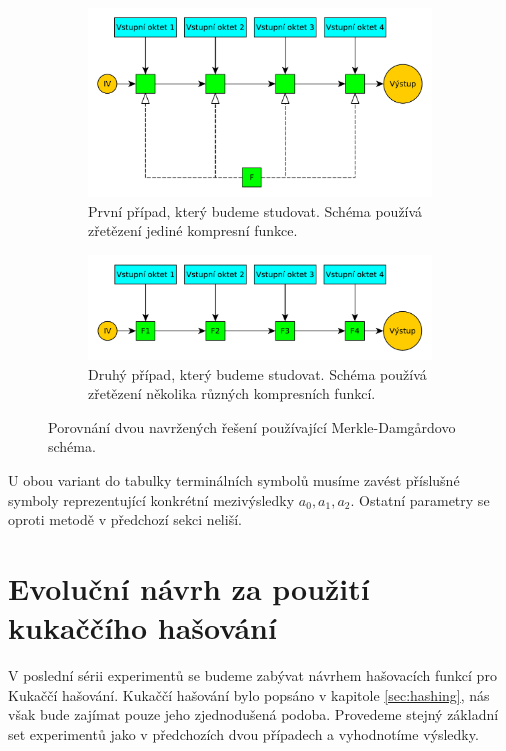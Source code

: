 \begin{figure}[!ht]
\begin{subfigure}[b]{0.49\textwidth}
	\includegraphics[width=\textwidth]{fig/merkle_damgard_design1}
	\caption{První případ, který budeme studovat. Schéma používá zřetězení jediné kompresní funkce.}
\end{subfigure}
\begin{subfigure}[b]{0.49\textwidth}
	\includegraphics[width=\textwidth]{fig/merkle_damgard_design2}
	\caption{Druhý případ, který budeme studovat. Schéma používá zřetězení několika různých kompresních funkcí.}
\end{subfigure}
	\caption{Porovnání dvou navržených řešení používající Merkle-Damg\r{a}rdovo schéma.}
\end{figure}

U obou variant do tabulky terminálních symbolů musíme zavést příslušné symboly reprezentující
konkrétní mezivýsledky $a_0, a_1, a_2$. Ostatní parametry se oproti metodě v předchozí sekci neliší.

\section{Evoluční návrh za použití kukaččího hašování}

V poslední sérii experimentů se budeme zabývat návrhem hašovacích funkcí pro Kukaččí hašování.
Kukaččí hašování bylo popsáno v kapitole \ref{sec:hashing}, nás však bude zajímat pouze jeho
zjednodušená podoba. Provedeme stejný základní set experimentů jako v předchozích dvou případech
a vyhodnotíme výsledky.

